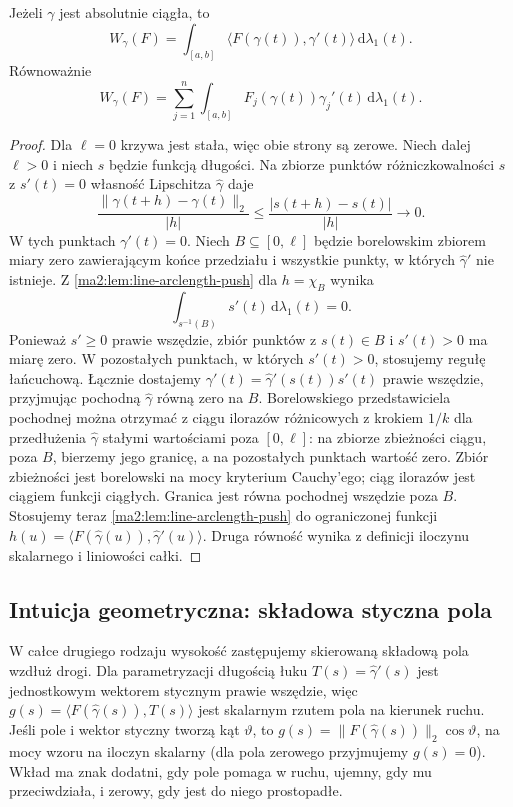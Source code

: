 \begin{twierdzenie}
\label{ma2:thm:line-second-speed}
Jeżeli $\gamma$ jest absolutnie ciągła,
to
\[
 W_\gamma(F)=\int_{[a,b]}
 \langle F(\gamma(t)),\gamma'(t)\rangle
 \,\mathrm d\lambda_1(t).
\]
Równoważnie
\[
 W_\gamma(F)=\sum_{j=1}^n
 \int_{[a,b]}F_j(\gamma(t))\gamma_j'(t)
 \,\mathrm d\lambda_1(t).
\]
\end{twierdzenie}
\begin{proof}
Dla $\ell=0$ krzywa jest stała, więc obie strony
są zerowe. Niech dalej $\ell>0$ i niech $s$
będzie funkcją długości.
Na zbiorze punktów różniczkowalności $s$
z $s'(t)=0$ własność Lipschitza
$\widehat\gamma$ daje
\[
 \frac{\|\gamma(t+h)-\gamma(t)\|_2}{|h|}
 \le \frac{|s(t+h)-s(t)|}{|h|}\longrightarrow0.
\]
W tych punktach $\gamma'(t)=0$.
Niech $B\subseteq[0,\ell]$ będzie borelowskim
zbiorem miary zero zawierającym końce przedziału
i wszystkie punkty, w których
$\widehat\gamma'$ nie istnieje.
Z \ref{ma2:lem:line-arclength-push} dla $h=\chi_B$
wynika
\[
 \int_{s^{-1}(B)}s'(t)\,\mathrm d\lambda_1(t)=0.
\]
Ponieważ $s'\ge0$ prawie wszędzie, zbiór
punktów z $s(t)\in B$ i $s'(t)>0$
ma miarę zero. W pozostałych punktach,
w których $s'(t)>0$, stosujemy regułę
łańcuchową. Łącznie dostajemy
$\gamma'(t)=\widehat\gamma'(s(t))s'(t)$
prawie wszędzie, przyjmując pochodną
$\widehat\gamma$ równą zero na $B$.
Borelowskiego przedstawiciela pochodnej
można otrzymać z ciągu ilorazów różnicowych
z krokiem $1/k$ dla przedłużenia
$\widehat\gamma$ stałymi wartościami poza
$[0,\ell]$: na zbiorze zbieżności ciągu,
poza $B$, bierzemy jego granicę, a na
pozostałych punktach wartość zero. Zbiór
zbieżności jest borelowski na mocy kryterium
Cauchy'ego; ciąg ilorazów jest ciągiem funkcji
ciągłych. Granica jest równa pochodnej
wszędzie poza $B$.
Stosujemy teraz \ref{ma2:lem:line-arclength-push}
do ograniczonej funkcji
$h(u)=\langle F(\widehat\gamma(u)),
\widehat\gamma'(u)\rangle$.
Druga równość wynika z definicji iloczynu
skalarnego i liniowości całki.
\end{proof}


\subsection{Intuicja geometryczna: składowa styczna pola}
\label{ma2:sec:line-tangent-intuition}

W całce drugiego rodzaju wysokość zastępujemy
skierowaną składową pola wzdłuż drogi.
Dla parametryzacji długością łuku
$T(s)=\widehat\gamma'(s)$ jest jednostkowym
wektorem stycznym prawie wszędzie, więc
$g(s)=\langle F(\widehat\gamma(s)),T(s)\rangle$
jest skalarnym rzutem pola na kierunek ruchu.
Jeśli pole i wektor styczny tworzą kąt $\vartheta$,
to $g(s)=\|F(\widehat\gamma(s))\|_2\cos\vartheta$,
na mocy wzoru na iloczyn skalarny (dla pola
zerowego przyjmujemy $g(s)=0$).
Wkład ma znak dodatni, gdy pole pomaga w ruchu,
ujemny, gdy mu przeciwdziała, i zerowy,
gdy jest do niego prostopadłe.

